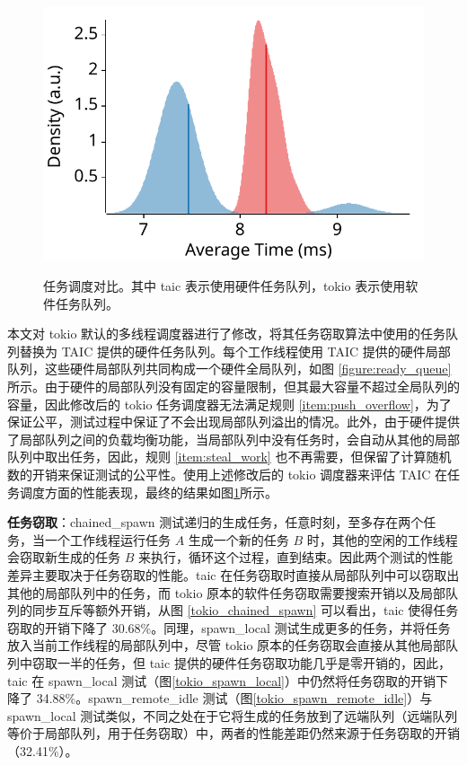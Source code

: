 \begin{figure}[htbp]
\begin{minipage}[c]{0.32\textwidth}
		\includegraphics[width=\textwidth]{figures/tokio/spawn_remote_busy.pdf}
		\label{tokio_spawn_remote_busy}
	\end{minipage}
    \caption[任务调度对比]{任务调度对比。其中 taic 表示使用硬件任务队列，tokio 表示使用软件任务队列。}
    \label{figure:tokio-bench}
\end{figure}

本文对 tokio 默认的多线程调度器进行了修改，将其任务窃取算法中使用的任务队列替换为 TAIC 提供的硬件任务队列。每个工作线程使用 TAIC 提供的硬件局部队列，这些硬件局部队列共同构成一个硬件全局队列，如图 \ref{figure:ready_queue} 所示。由于硬件的局部队列没有固定的容量限制，但其最大容量不超过全局队列的容量，因此修改后的 tokio 任务调度器无法满足规则 \ref{item:push_overflow}，为了保证公平，测试过程中保证了不会出现局部队列溢出的情况。此外，由于硬件提供了局部队列之间的负载均衡功能，当局部队列中没有任务时，会自动从其他的局部队列中取出任务，因此，规则 \ref{item:steal_work} 也不再需要，但保留了计算随机数的开销来保证测试的公平性。使用上述修改后的 tokio 调度器来评估 TAIC 在任务调度方面的性能表现，最终的结果如图\ref{figure:tokio-bench}所示。

\textbf{任务窃取}：chained\_spawn 测试递归的生成任务，任意时刻，至多存在两个任务，当一个工作线程运行任务 $A$ 生成一个新的任务 $B$ 时，其他的空闲的工作线程会窃取新生成的任务 $B$ 来执行，循环这个过程，直到结束。因此两个测试的性能差异主要取决于任务窃取的性能。taic 在任务窃取时直接从局部队列中可以窃取出其他的局部队列中的任务，而 tokio 原本的软件任务窃取需要搜索开销以及局部队列的同步互斥等额外开销，从图 \ref{tokio_chained_spawn} 可以看出，taic 使得任务窃取的开销下降了 30.68\%。同理，spawn\_local 测试生成更多的任务，并将任务放入当前工作线程的局部队列中，尽管 tokio 原本的任务窃取会直接从其他局部队列中窃取一半的任务，但 taic 提供的硬件任务窃取功能几乎是零开销的，因此，taic 在 spawn\_local 测试（图\ref{tokio_spawn_local}）中仍然将任务窃取的开销下降了 34.88\%。spawn\_remote\_idle 测试（图\ref{tokio_spawn_remote_idle}）与 spawn\_local 测试类似，不同之处在于它将生成的任务放到了远端队列（远端队列等价于局部队列，用于任务窃取）中，两者的性能差距仍然来源于任务窃取的开销（32.41\%）。

